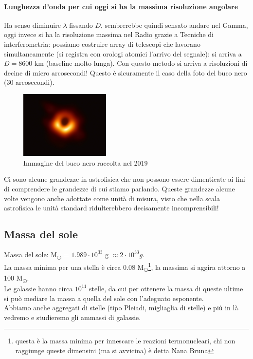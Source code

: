\paragraph{Lunghezza d'onda per cui oggi si ha la massima risoluzione angolare}%
Ha senso diminuire $\lambda$ fissando $D$, sembrerebbe quindi sensato andare nel Gamma, oggi invece si ha la risoluzione massima nel Radio grazie a Tecniche di interferometria: possiamo costruire array di telescopi che lavorano simultaneamente (si registra con orologi atomici l'arrivo del segnale): si arriva a  $D = 8600$ km (baseline molto lunga). Con questo metodo si arriva a risoluzioni di decine di micro arcosecondi! Questo è sicuramente il caso della foto del buco nero (30 arcosecondi). 
\begin{figure}[H]
	\centering
	\includegraphics[width=0.4\textwidth]{figures/buconeroimmagine.jpg}
	\caption{Immagine del buco nero raccolta nel 2019}
	\label{fig:figures-buconeroimmagine-jpg}
\end{figure}

Ci sono alcune grandezze in astrofisica che non possono essere dimenticate ai fini di comprendere le grandezze di cui stiamo parlando. Queste grandezze alcune volte vengono anche adottate come unità di misura, visto che nella scala astrofisica le unità standard ridulterebbero decisamente incomprensibili!\\

\subsection{Massa del sole}%
Massa del sole: M\textsubscript{\(\odot\)} = $1.989 \cdot 10^{33}$ g $\approx 2 \cdot 10^{33} g$.\\
La massa minima per una stella è circa 0.08 M\textsubscript{\(\odot\)}\footnote{questa è la massa minima per innescare le reazioni termonucleari, chi non raggiunge queste dimensini (ma si avvicina) è detta Nana Bruna}, la massima si aggira attorno a 100 M\textsubscript{\(\odot\)}. \\
Le galassie hanno circa $10^{11}$ stelle, da cui per ottenere la massa di queste ultime si può mediare la massa a quella del sole con l'adeguato esponente. \\
Abbiamo anche aggregati di stelle (tipo Pleiadi, migliaglia di stelle) e più in là vedremo e studieremo gli ammassi di galassie.

